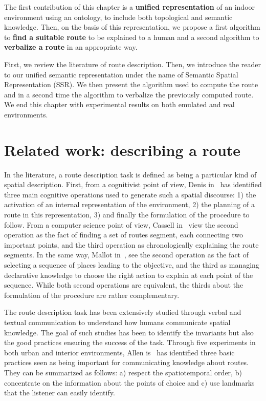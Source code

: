 The first contribution of this chapter is a \textbf{unified representation} of an indoor environment using an ontology, to include both topological and semantic knowledge. Then, on the basis of this representation, we propose a first algorithm to \textbf{find a suitable route} to be explained to a human and a second algorithm to \textbf{verbalize a route} in an appropriate way.

First, we review the literature of route description. Then, we introduce the reader to our unified semantic representation under the name of Semantic Spatial Representation (SSR). We then present the algorithm used to compute the route and in a second time the algorithm to verbalize the previously computed route. We end this chapter with experimental results on both emulated and real environments.

\section[Related work]{Related work: describing a route}


In the literature, a route description task is defined as being a particular kind of spatial description. First, from a cognitivist point of view, Denis in~\cite{denis_1997_description} has identified three main cognitive operations used to generate such a spatial discourse: 1) the activation of an internal representation of the environment, 2) the planning of a route in this representation, 3) and finally the formulation of the procedure to follow. From a computer science point of view, Cassell in~\cite{cassell_2007_trading} view the second operation as the fact of finding a set of routes segment, each connecting two important points, and the third operation as chronologically explaining the route segments. In the same way, Mallot in~\cite{mallot_2009_embodied}, see the second operation as the fact of selecting a sequence of places leading to the objective, and the third as managing declarative knowledge to choose the right action to explain at each point of the sequence. While both second operations are equivalent, the thirds about the formulation of the procedure are rather complementary.

The route description task has been extensively studied through verbal and textual communication to understand how humans communicate spatial knowledge. The goal of such studies has been to identify the invariants but also the good practices ensuring the success of the task. Through five experiments in both urban and interior environments, Allen is~\cite{allen_2000_principles} has identified three basic practices seen as being important for communicating knowledge about routes. They can be summarized as follows: a) respect the spatiotemporal order, b) concentrate on the information about the points of choice and c) use landmarks that the listener can easily identify.

